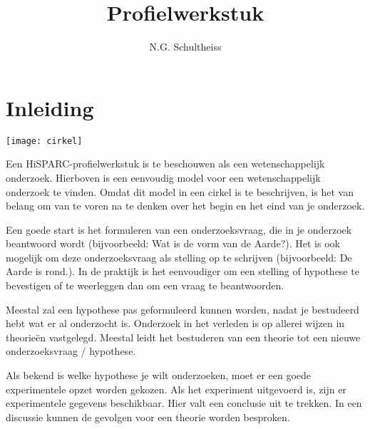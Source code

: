 



\title{Profielwerkstuk}
\author{N.G. Schultheiss}
\date{}

\maketitle
\thispagestyle{firststyle}

\section{Inleiding}

\noindent \begin{center}
\texttt{[image: cirkel]}
\par\end{center}

Een HiSPARC-profielwerkstuk is te beschouwen als een wetenschappelijk
onderzoek. Hierboven is een eenvoudig model voor een wetenschappelijk
onderzoek te vinden. Omdat dit model in een cirkel is te beschrijven,
is het van belang om van te voren na te denken over het begin en het
eind van je onderzoek.

Een goede start is het formuleren van een onderzoeksvraag, die in
je onderzoek beantwoord wordt (bijvoorbeeld: Wat is de vorm van de
Aarde?). Het is ook mogelijk om deze onderzoeksvraag als stelling
op te schrijven (bijvoorbeeld: De Aarde is rond.). In de praktijk
is het eenvoudiger om een stelling of hypothese te bevestigen of te
weerleggen dan om een vraag te beantwoorden.

Meestal zal een hypothese pas geformuleerd kunnen worden, nadat je
bestudeerd hebt wat er al onderzocht is. Onderzoek in het verleden
is op allerei wijzen in theorieën vastgelegd. Meestal leidt het bestuderen
van een theorie tot een nieuwe onderzoeksvraag / hypothese.

Als bekend is welke hypothese je wilt onderzoeken, moet er een goede
experimentele opzet worden gekozen. Als het experiment uitgevoerd
is, zijn er experimentele gegevens beschikbaar. Hier valt een conclusie
uit te trekken. In een discussie kunnen de gevolgen voor een theorie
worden besproken.

